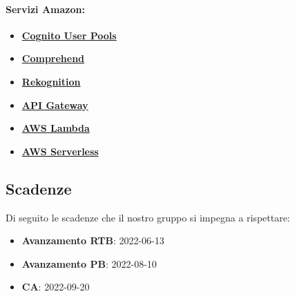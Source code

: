 	\paragraph{\textbf{Servizi Amazon:}} 
\begin{itemize}
	\item
	\href {https://docs.aws.amazon.com/cognito/latest/developerguide/cognito-user-identity-pools.html}{\textbf{Cognito User Pools}}
	\item
	\href{https://docs.aws.amazon.com/comprehend/latest/dg/what-is.html}{\textbf{Comprehend}}
	\item 
	\href{https://docs.aws.amazon.com/rekognition/latest/dg/what-is.html}{\textbf{Rekognition}}
	\item 
	\href{https://docs.aws.amazon.com/apigateway/latest/developerguide/welcome.html}{\textbf{API Gateway}}
	\item
	\href{https://docs.aws.amazon.com/lambda/latest/dg/welcome.html}{\textbf{AWS Lambda}}
	\item 
	\href{https://docs.aws.amazon.com/serverless-application-model/latest/developerguide/what-is-sam.html}{\textbf{AWS Serverless}}
\end{itemize}

\subsection{Scadenze}
Di seguito le scadenze che il nostro gruppo si impegna a rispettare:
\begin{itemize}
	\item \textbf{Avanzamento RTB}: 2022-06-13
	\item \textbf{Avanzamento PB}: 2022-08-10
	\item \textbf{CA}: 2022-09-20
\end{itemize}
